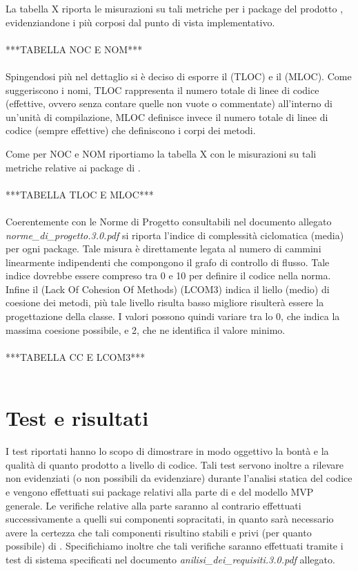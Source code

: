 La tabella X riporta le misurazioni su tali metriche per i package del prodotto \caName{}, evidenziandone i più corposi dal punto di vista implementativo.
\\\\
***TABELLA NOC E NOM***
\\\\
Spingendosi più nel dettaglio si è deciso di esporre il  (TLOC) e il  (MLOC).
Come suggeriscono i nomi, TLOC rappresenta il numero totale di linee di codice (effettive, ovvero senza contare quelle non vuote o commentate) all'interno di un'unità di compilazione, MLOC definisce invece il numero totale di linee di codice (sempre effettive) che definiscono i corpi dei metodi. 

Come per NOC e NOM riportiamo la tabella X con le misurazioni su tali metriche relative ai package di \caName{}.
\\\\
***TABELLA TLOC E MLOC***
\\\\
Coerentemente con le Norme di Progetto consultabili nel documento allegato \textit{norme\_di\_progetto.3.0.pdf} si riporta l'indice di complessità ciclomatica (media) per ogni package. Tale misura è direttamente legata al numero di cammini linearmente indipendenti che compongono il grafo di controllo di flusso. Tale indice dovrebbe essere compreso tra 0 e 10 per definire il codice nella norma.
Infine il \inglese(Lack Of Cohesion Of Methods) (LCOM3) indica il liello (medio) di coesione dei metodi, più tale livello risulta basso migliore risulterà essere la progettazione della classe. I valori possono quindi variare tra lo 0, che indica la massima coesione possibile, e 2, che ne identifica il valore minimo.
\\\\
***TABELLA CC E LCOM3***
\\\
\section{Test e risultati}
I test riportati hanno lo scopo di dimostrare in modo oggettivo la bontà e la qualità di quanto prodotto a livello di codice. Tali test servono inoltre a rilevare  non evidenziati (o non possibili da evidenziare) durante l'analisi statica del codice e vengono effettuati sui package relativi alla parte di  e  del modello MVP generale.
Le verifiche relative alla parte \inglese{View} saranno al contrario effettuati successivamente a quelli sui componenti sopracitati, in quanto sarà necessario avere la certezza che tali componenti risultino stabili e privi (per quanto possibile) di \inglese{bug}. 
Specifichiamo inoltre che tali verifiche saranno effettuati tramite i test di sistema specificati nel documento \textit{anilisi\_dei\_requisiti.3.0.pdf} allegato.

